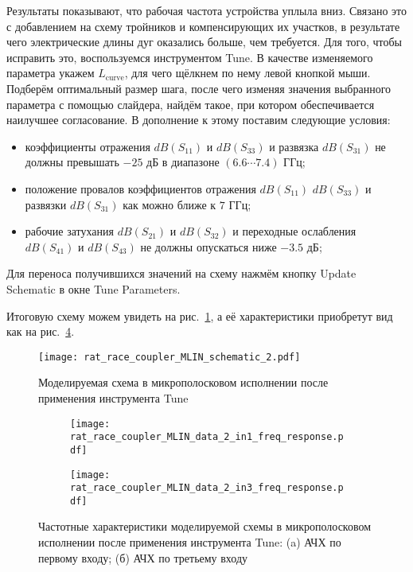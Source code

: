 Результаты показывают, что рабочая частота устройства уплыла вниз. Связано это с добавлением на схему тройников и компенсирующих их участков, в результате чего электрические длины дуг оказались больше, чем требуется.
Для того, чтобы исправить это, воспользуемся инструментом Tune.
В качестве изменяемого параметра укажем $L_\text{curve}$, для чего щёлкнем по нему левой кнопкой мыши.
Подберём оптимальный размер шага, после чего изменяя значения выбранного параметра с помощью слайдера, найдём такое, при котором обеспечивается наилучшее согласование.
В дополнение к этому поставим следующие условия:
\begin{itemize}
    \item коэффициенты отражения $dB(S_{11})$ и $dB(S_{33})$ и развязка $dB(S_{31})$ не должны превышать $-25 \text{~дБ}$ в диапазоне $(6.6 \cdots 7.4) \text{~ГГц}$;
    \item положение провалов коэффициентов отражения $dB(S_{11})$ $dB(S_{33})$ и развязки $dB(S_{31})$ как можно ближе к $7 \text{~ГГц}$;
    \item рабочие затухания $dB(S_{21})$ и $dB(S_{32})$ и переходные ослабления $dB(S_{41})$ и $dB(S_{43})$ не должны опускаться ниже $-3.5 \text{~дБ}$;
\end{itemize}
Для переноса получившихся значений на схему нажмём кнопку Update Schematic в окне Tune Parameters.

Итоговую схему можем увидеть на рис.~\ref{fig:rat_race_coupler_MLIN_schematic_2}, а её характеристики приобретут вид как на рис.~\ref{fig:rat_race_coupler_MLIN_data_2}.

\begin{figure}
    \centering
    \texttt{[image: rat\_race\_coupler\_MLIN\_schematic\_2.pdf]}
    \caption{Моделируемая схема в микрополосковом исполнении после применения инструмента Tune}%
    \label{fig:rat_race_coupler_MLIN_schematic_2}
\end{figure}

\begin{figure}[!ht]
    \centering
    \begin{subfigure}[b]{0.45\textwidth}
        \centering
        \texttt{[image: rat\_race\_coupler\_MLIN\_data\_2\_in1\_freq\_response.pdf]}
        \caption{}%
    \label{fig:rat_race_coupler_MLIN_data_2_in1_freq_response}
    \end{subfigure}
    \hfill
    \begin{subfigure}[b]{0.45\textwidth}
        \centering
        \texttt{[image: rat\_race\_coupler\_MLIN\_data\_2\_in3\_freq\_response.pdf]}
        \caption{}%
    \label{fig:rat_race_coupler_MLIN_data_2_in3_freq_response}
    \end{subfigure}
    \caption{%
        Частотные характеристики моделируемой схемы в микрополосковом исполнении после применения инструмента Tune:
        (a) АЧХ по первому входу;
        (б) АЧХ по третьему входу
    }%
    \label{fig:rat_race_coupler_MLIN_data_2}
\end{figure}

